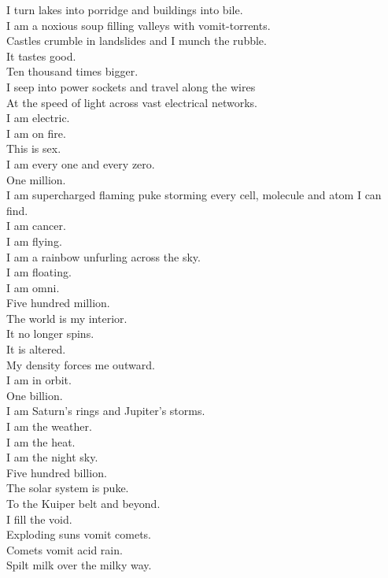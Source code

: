 I turn lakes into porridge and buildings into bile. \\
I am a noxious soup filling valleys with vomit-torrents. \\
Castles crumble in landslides and I munch the rubble. \\
It tastes good. \\

Ten thousand times bigger. \\
I seep into power sockets and travel along the wires \\
At the speed of light across vast electrical networks. \\
I am electric. \\
I am on fire. \\
This is sex. \\
I am every one and every zero. \\

One million. \\
I am supercharged flaming puke storming every cell, molecule and atom I can find. \\
I am cancer. \\
I am flying. \\
I am a rainbow unfurling across the sky. \\
I am floating. \\
I am omni. \\

Five hundred million. \\
The world is my interior. \\
It no longer spins. \\
It is altered. \\
My density forces me outward. \\
I am in orbit. \\

One billion. \\
I am Saturn's rings and Jupiter's storms. \\
I am the weather. \\
I am the  heat. \\
I am the night sky. \\

Five hundred billion. \\
The solar system is puke. \\
To the Kuiper belt and beyond. \\
I fill the void. \\
Exploding suns vomit comets. \\
Comets vomit acid rain. \\
Spilt milk over the milky way. \\

